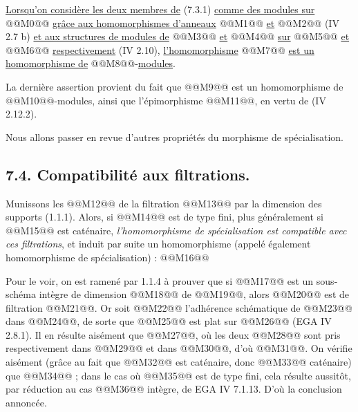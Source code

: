 
\noindent \uline{Lorsqu'on considère les deux membres de} (7.3.1) \uline{comme des modules sur} @@M0@@ \uline{grâce aux homomorphismes d'anneaux} @@M1@@ \uline{et} @@M2@@ (IV 2.7 b) \uline{et aux structures de modules de} @@M3@@ \uline{et} @@M4@@ \uline{sur} @@M5@@ \uline{et} @@M6@@ \uline{respectivement} (IV 2.10), \uline{l'homomorphisme} @@M7@@ \uline{est un homomorphisme de} @@M8@@-\uline{modules}.

La dernière assertion provient du fait que @@M9@@ est un homomorphisme de @@M10@@-modules, ainsi que l'épimorphisme @@M11@@, en vertu de (IV 2.12.2).

Nous allons passer en revue d'autres propriétés du morphisme de spécialisation.

\subsection*{7.4. Compatibilité aux filtrations.}
Munissons les @@M12@@ de la filtration @@M13@@ par la dimension des supports (1.1.1). Alors, si @@M14@@ est de type fini, plus généralement si @@M15@@ est caténaire, \emph{l'homomorphisme de spécialisation est compatible avec ces filtrations}, et induit par suite un homomorphisme (appelé également homomorphisme de spécialisation) :
@@M16@@

Pour le voir, on est ramené par 1.1.4 à prouver que si @@M17@@ est un sous-schéma intègre de dimension @@M18@@ de @@M19@@, alors @@M20@@ est de filtration @@M21@@. Or soit @@M22@@ l'adhérence schématique de @@M23@@ dans @@M24@@, de sorte que @@M25@@ est plat sur @@M26@@ (EGA IV 2.8.1). Il en résulte aisément que @@M27@@, où les deux @@M28@@ sont pris respectivement dans @@M29@@ et dans @@M30@@, d'où @@M31@@. On vérifie aisément (grâce au fait que @@M32@@ est caténaire, donc @@M33@@ caténaire) que @@M34@@ ; dans le cas où @@M35@@ est de type fini, cela résulte aussitôt, par réduction au cas @@M36@@ intègre, de EGA IV 7.1.13. D'où la conclusion annoncée.

